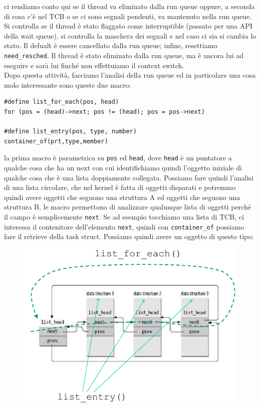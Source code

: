 \documentclass[12pt, oneside]{extbook}
\begin{document}
ci rendiamo conto qui se il thread va eliminato dalla run queue oppure, a seconda di cosa c'è nel TCB o se ci sono segnali pendenti, va mantenuto nella run queue. Si controlla se il thread è stato flaggato come interruptible (passato per una API della wait queue), si controlla la maschera dei segnali e nel caso ci sia si cambia lo stato. Il defualt è essere cancellato dalla run queue; infine, resettiamo \texttt{need\_resched}. Il thread è stato eliminato dalla run queue, ma è ancora lui ad eseguire e sarà lui finché non effettuiamo il context switch.\\Dopo questa attività, facciamo l'analisi della run queue ed in particolare una cosa molo interessante sono queste due macro:
\begin{lstlisting}
#define list_for_each(pos, head)
for (pos = (head)->next; pos != (head); pos = pos->next)

#define list_entry(pos, type, number)
container_of(prt,type,member)
\end{lstlisting}
la prima macro è parametrica su \texttt{pos} ed \texttt{head}, dove \texttt{head} è un puntatore a qualche cosa che ha un next con cui identifichiamo quindi l'oggetto iniziale di qualche cosa che è una lista doppiamente collegata. Possiamo fare quindi l'analisi di una lista circolare, che nel kernel è fatta di oggetti disparati e potremmo quindi avere oggetti che seguono una struttura A ed oggetti che seguono una struttura B, le macro permettono di analizzare qualunque lista di oggetti perché il campo è semplicemente \texttt{next}. Se ad esempio tocchiamo una lista di TCB, ci interessa il contenitore dell'elemento \texttt{next}, quindi con \texttt{container\_of} possiamo fare il retrieve della task struct. Possiamo quindi avere un oggetto di questo tipo:
\begin{figure}[!h]
	\includegraphics[scale=0.5]{immagini/scan_tcb.png}
\end{figure}
\end{document}

